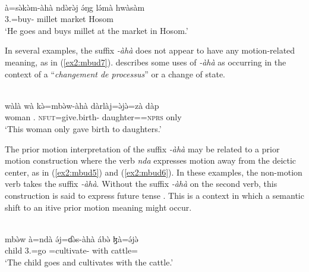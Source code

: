 \ex\label{ex2:mbud14}
 \\
\gll à=sə̀kə̀m-àhà ndə̀rə̀j ə́ŋg lə́mà hwàsàm	 \\
3.=buy- millet  market Hosom	\\
\glt `He goes and buys millet at the market in Hosom.' 
\z

In several examples, the suffix \textit{-àhà} does not appear to have any motion-related meaning, as in (\ref{ex2:mbud7}).  \citet[291]{fobakayyangPhonologieMorphologieSyntaxe2021} describes some uses of \textit{-àhà} as occurring in the context of a ``\textit{changement de processus}'' or a change of state.

\ea\label{ex2:mbud7}
 \\
\gll  wàlà	wà	kə̀=mbə̀w-àhà	dàrlàj=ə̀jə̀=zà	dàp	\\
woman	.	\textsc{nfut}=give.birth-	daughter==\textsc{nprs}	only	 \\
\glt `This woman only gave birth to daughters.' 
\z 

The prior motion interpretation of the suffix \textit{-àhà} may be related to a prior motion construction where the verb \textit{nda} expresses motion away from the deictic center, as in (\ref{ex2:mbud5}) and (\ref{ex2:mbud6}). In these examples, the non-motion verb takes the suffix \textit {-àhà}. Without the suffix \textit {-àhà} on the second verb, this construction is said to express future tense \citep[220; but see 271 for counterexamples in the imperative]{fobakayyangPhonologieMorphologieSyntaxe2021}. This is a context in which a semantic shift to an itive prior motion meaning might occur. 

\ea\label{ex2:mbud5}
 \\
\gll mbə̀w	à=ndà	ə́j=ɗə̀s-àhà	ábə̀	ɮà=ə́jə̀ \\
child	3.=go	=cultivate-	with	cattle= \\
\glt `The child goes and cultivates with the cattle.' 

